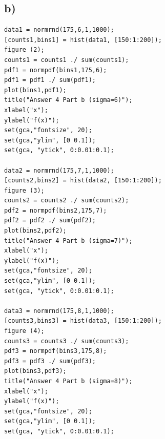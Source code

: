 \documentclass[12pt]{article}
\begin{document}
\subsection*{b)} 
\begin{Verbatim}[tabsize=4]
data1 = normrnd(175,6,1,1000);
[counts1,bins1] = hist(data1, [150:1:200]);
figure (2);
counts1 = counts1 ./ sum(counts1);
pdf1 = normpdf(bins1,175,6);
pdf1 = pdf1 ./ sum(pdf1);
plot(bins1,pdf1);
title("Answer 4 Part b (sigma=6)");
xlabel("x");
ylabel("f(x)");
set(gca,"fontsize", 20);
set(gca,"ylim", [0 0.1]);
set(gca, "ytick", 0:0.01:0.1);

data2 = normrnd(175,7,1,1000);
[counts2,bins2] = hist(data2, [150:1:200]);
figure (3);
counts2 = counts2 ./ sum(counts2);
pdf2 = normpdf(bins2,175,7);
pdf2 = pdf2 ./ sum(pdf2);
plot(bins2,pdf2);
title("Answer 4 Part b (sigma=7)");
xlabel("x");
ylabel("f(x)");
set(gca,"fontsize", 20);
set(gca,"ylim", [0 0.1]);
set(gca, "ytick", 0:0.01:0.1);

data3 = normrnd(175,8,1,1000);
[counts3,bins3] = hist(data3, [150:1:200]);
figure (4);
counts3 = counts3 ./ sum(counts3);
pdf3 = normpdf(bins3,175,8);
pdf3 = pdf3 ./ sum(pdf3);
plot(bins3,pdf3);
title("Answer 4 Part b (sigma=8)");
xlabel("x");
ylabel("f(x)");
set(gca,"fontsize", 20);
set(gca,"ylim", [0 0.1]);
set(gca, "ytick", 0:0.01:0.1);
\end{Verbatim}
\end{document}

